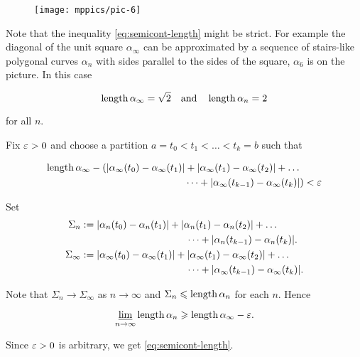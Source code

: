\begin{wrapfigure}{r}{20 mm}
\vskip-0mm
\centering
\texttt{[image: mppics/pic-6]}
\end{wrapfigure}



Note that the inequality \ref{eq:semicont-length}%
might be strict.
For example the diagonal of the unit square $\alpha_\infty$ 
can be  approximated by a sequence of stairs-like
polygonal curves $\alpha_n$
with sides parallel to the sides of the square,
$\alpha_6$ is on the picture.
In this case

\[\mathop{\rm length}\nolimits\alpha_\infty=\sqrt{2}\quad
\text{and}\quad \mathop{\rm length}\nolimits\alpha_n=2\]

for all $n$.



Fix $\varepsilon > 0$ and choose a partition $a=t_0<t_1<\dots<t_k=b$
such that 

\begin{align*}
\mathop{\rm length}\nolimits\alpha_\infty-
(|\alpha_\infty(t_0)-\alpha_\infty(t_1)|&+|\alpha_\infty(t_1)-\alpha_\infty(t_2)|+\dots
\\
&\dots+|\alpha_\infty(t_{k-1})-\alpha_\infty(t_k)|)<\varepsilon
\end{align*}





Set 
\begin{align*}\Sigma_n
&\df
|\alpha_n(t_0)-\alpha_n(t_1)|+|\alpha_n(t_1)-\alpha_n(t_2)|+\dots
\\
&\ \ \ \ \ \ \ \ \ \ \ \ \ \ \ \ \ \ \ \ \ \ \ \ \ \ \ \ \ \ \ \ \dots+|\alpha_n(t_{k-1})-\alpha_n(t_k)|.
\\
\Sigma_\infty
&\df
|\alpha_\infty(t_0)-\alpha_\infty(t_1)|+|\alpha_\infty(t_1)-\alpha_\infty(t_2)|+\dots
\\
&\ \ \ \ \ \ \ \ \ \ \ \ \ \ \ \ \ \ \ \ \ \ \ \ \ \ \ \ \ \ \ \ \dots+|\alpha_\infty(t_{k-1})-\alpha_\infty(t_k)|.
\end{align*}

Note that $\Sigma_n\to \Sigma_\infty$ as $n\to\infty$
and $\Sigma_n\leqslant\mathop{\rm length}\nolimits\alpha_n$ for each $n$.
Hence

$$\varliminf_{n\to\infty} \mathop{\rm length}\nolimits\alpha_n \geqslant \mathop{\rm length}\nolimits\alpha_\infty-\varepsilon.$$

Since $\varepsilon>0$ is arbitrary, we get \ref{eq:semicont-length}.\qeds%



